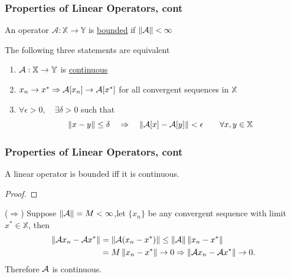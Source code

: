 \documentclass{beamer}
\begin{document}
\begin{frame}\frametitle{Properties of Linear Operators, cont}
	\begin{definition}
		An operator $\mathcal{A}:\mathbb{X}\to \mathbb{Y}$ is \underline{bounded} if
		$\left\|\mathcal{A}\right\| < \infty$
	\end{definition}
	
	\vfill

	\begin{definition}
		The following three statements are equivalent
		\begin{enumerate}
			\item $\mathcal{A}:\mathbb{X}\to\mathbb{Y}$ is \underline{continuous}
			\item $x_n \to x^\ast \Rightarrow \mathcal{A}[x_n] \to \mathcal{A}[x^\ast] $ for all convergent sequences in $\mathbb{X}$
			\item $\forall \epsilon > 0, \quad \exists \delta > 0$ such that
				\[
				\left\|x - y\right\| \leq \delta \quad \Rightarrow \quad \left\| \mathcal{A}[x]-\mathcal{A}[y] \right\| < \epsilon \qquad \forall x,y \in \mathbb{X} 
				\]
		\end{enumerate}
	\end{definition}
\end{frame}

\begin{frame}\frametitle{Properties of Linear Operators, cont}
	\begin{theorem}
		A linear operator is bounded iff it is continuous.
	\end{theorem}

	\begin{proof}\end{proof}
	($\Rightarrow$) Suppose $\left\| \mathcal{A} \right\|=M < \infty$,let $\{x_n\}$ be any convergent sequence with limit $x^\ast\in\mathbb{X}$, then 
	\begin{align*}
	\left\| \mathcal{A} x_n - \mathcal{A} x^\ast \right\| &= \left\| \mathcal{A}(x_n-x^\ast) \right\| \leq \left\| \mathcal{A} \right\|\left\|x_n-x^\ast \right\|\\
		&= M\left\| x_n-x^\ast \right\|\to 0 \Rightarrow \left\|\mathcal{A} x_n-\mathcal{A} x^\ast \right\|\to 0.
	\end{align*}
	Therefore $\mathcal{A}$ is continuous.
	
\end{frame}
\end{document}
